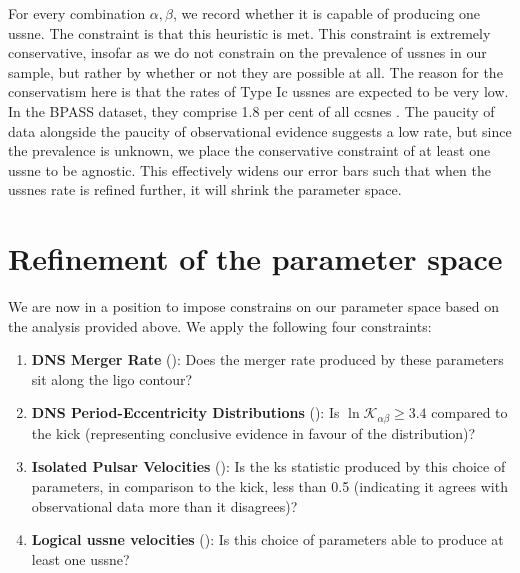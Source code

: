 For every combination $\alpha, \beta$, we record whether it is capable of producing one \gls{ussne}. The constraint is that this heuristic is met. This constraint is extremely conservative, insofar as we do not constrain on the prevalence of \glspl{ussne} in our sample, but rather by whether or not they are possible at all. The reason for the conservatism here is that the rates of Type Ic \glspl{ussne} are expected to be very low. In the BPASS dataset, they comprise 1.8 per cent of all \glspl{ccsne} \citep{Stevance:2022}. The paucity of data alongside the paucity of observational evidence suggests a low rate, but since the prevalence is unknown, we place the conservative constraint of at least one \gls{ussne} to be agnostic. This effectively widens our error bars such that when the \glspl{ussne} rate is refined further, it will shrink the parameter space.

\section{Refinement of the parameter space}

We are now in a position to impose constrains on our parameter space based on the analysis provided above. We apply the following four constraints:

\begin{enumerate}
    \item \textbf{DNS Merger Rate} (): Does the merger rate produced by these parameters sit along the \gls{ligo} contour?
    \item \textbf{DNS Period-Eccentricity Distributions} (): Is $\ln\mathcal{K}_{\alpha\beta}\geq 3.4$ compared to the \citet{Hobbs:2005} kick (representing conclusive evidence in favour of the distribution)?
    \item \textbf{Isolated Pulsar Velocities} (): Is the \gls{ks} statistic produced by this choice of parameters, in comparison to the \citet{Willcox:2021} kick, less than 0.5 (indicating it agrees with observational data more than it disagrees)?
    \item \textbf{Logical \gls{ussne} velocities} (): Is this choice of parameters able to produce at least one \gls{ussne}?
\end{enumerate}

